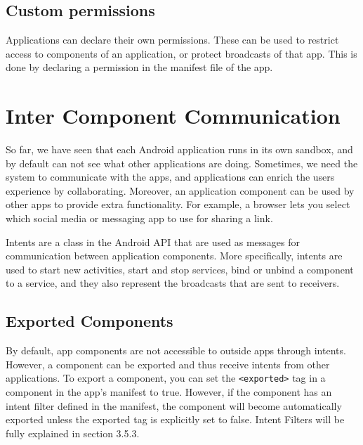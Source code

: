     \subsection{Custom permissions}
        \label{subsec:custom_permissions}
        
    Applications can declare their own permissions. These can be used to restrict access to components of an application, or protect broadcasts of that app. This is done by declaring a permission in the manifest file of the app.
    
    
    
    \section{Inter Component Communication}
        \label{sec:inter_component_communication}
    
    So far, we have seen that each Android application runs in its own sandbox, and by default can not see what other applications are doing. Sometimes, we need the system to communicate with the apps, and applications can enrich the users experience by collaborating. Moreover, an application component can be used by other apps to provide extra functionality. For example, a browser lets you select which social media or messaging app to use for sharing a link.
    
    Intents are a class in the Android API that are used as messages for communication between application components. More specifically, intents are used to start new activities, start and stop services, bind or unbind a component to a service, and they also represent the broadcasts that are sent to receivers.
    
    \subsection{Exported Components}
        \label{subsec:exported_components}
        
    By default, app components are not accessible to outside apps through intents. However, a component can be exported and thus receive intents from other applications. To export a component, you can set the \lstinline|<exported>| tag in a component in the app’s manifest to true. However, if the component has an intent filter defined in the manifest, the component will become automatically exported unless the exported tag is explicitly set to false. Intent Filters will be fully explained in section 3.5.3.
    
